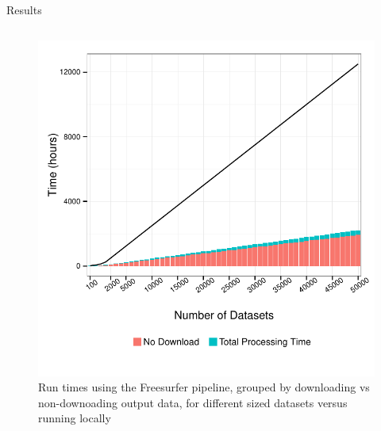 \documentclass[final,hyperref={pdfpagelabels=false}]{beamer}
\begin{document}
\begin{frame}
\begin{columns}
\begin{column}{.5\textwidth}
{\begin{block}{Results}
\begin{column}{.47\textwidth}
\begin{figure}
                  \includegraphics[width=.99\textwidth]{fs-times.pdf}
                  \caption{\label{fig:fs-times}Run times using the Freesurfer pipeline, grouped by downloading vs non-downoading output data, for different sized datasets versus running locally}
              \end{figure}

\end{column}
\end{block}}
\end{column}
\end{columns}
\end{frame}
\end{document}

